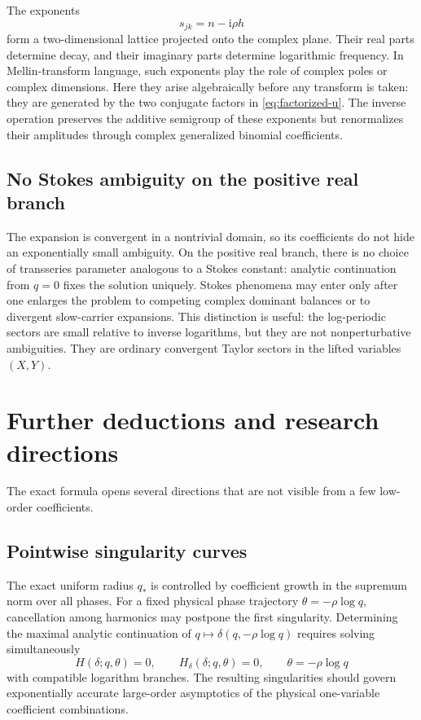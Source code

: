 \documentclass[11pt,oneside]{article}
\numberwithin{equation}{section}
\theoremstyle{plain}
\theoremstyle{definition}
\theoremstyle{remark}
\newcommand{\ii}{\mathrm i}
\begin{document}
The exponents
\begin{equation}\label{eq:complex-dimensions}
 s_{jk}=n-\ii\rho h
\end{equation}
form a two-dimensional lattice projected onto the complex plane.  Their
real parts determine decay, and their imaginary parts determine logarithmic
frequency.  In Mellin-transform language, such exponents play the role of
complex poles or complex dimensions.  Here they arise algebraically before
any transform is taken: they are generated by the two conjugate factors in
\cref{eq:factorized-u}.  The inverse operation preserves the additive
semigroup of these exponents but renormalizes their amplitudes through
complex generalized binomial coefficients.

\subsection{No Stokes ambiguity on the positive real branch}

The expansion is convergent in a nontrivial domain, so its coefficients do
not hide an exponentially small ambiguity.  On the positive real branch,
there is no choice of transseries parameter analogous to a Stokes constant:
analytic continuation from \(q=0\) fixes the solution uniquely.  Stokes
phenomena may enter only after one enlarges the problem to competing complex
dominant balances or to divergent slow-carrier expansions.  This distinction
is useful: the log-periodic sectors are small relative to inverse logarithms,
but they are not nonperturbative ambiguities.  They are ordinary convergent
Taylor sectors in the lifted variables \((X,Y)\).

\section{Further deductions and research directions}\label{sec:future}

The exact formula opens several directions that are not visible from a few
low-order coefficients.

\subsection{Pointwise singularity curves}

The exact uniform radius \(q_*\) is controlled by coefficient growth in the
supremum norm over all phases.  For a fixed physical phase trajectory
\(\theta=-\rho\log q\), cancellation among harmonics may postpone the first
singularity.  Determining the maximal analytic continuation of
\(q\mapsto\delta(q,-\rho\log q)\) requires solving simultaneously
\begin{equation}\label{eq:singularity-system}
 H(\delta;q,\theta)=0,
 \qquad
 H_\delta(\delta;q,\theta)=0,
 \qquad
 \theta=-\rho\log q
\end{equation}
with compatible logarithm branches.  The resulting singularities should
govern exponentially accurate large-order asymptotics of the physical
one-variable coefficient combinations.
\end{document}
